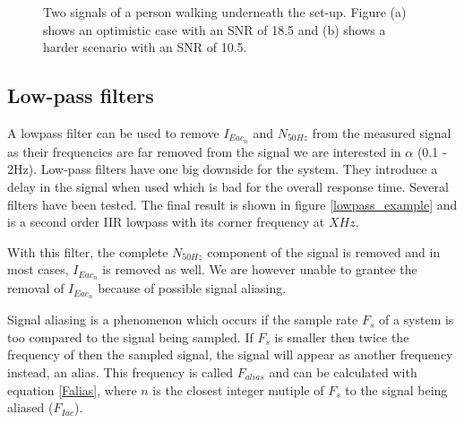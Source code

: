 \begin{figure}
	\centering     %
	\label{Original_signal}
	\caption{Two signals of a person walking underneath the set-up. Figure (a) shows an optimistic case with an SNR of 18.5 and (b) shows a harder scenario with an SNR of 10.5.}
\end{figure}

\subsection{Low-pass filters}
A lowpass filter can be used to remove $I_{Eac{_n}}$ and $N_{50Hz}$ from the measured signal as their frequencies are far removed from the signal we are interested in $\alpha$ (0.1 - 2Hz). Low-pass filters have one big downside for the system. They introduce a delay in the signal when used which is bad for the overall response time. Several filters have been tested. The final result is shown in figure \ref{lowpass_example} and is a second order IIR lowpass with its corner frequency at $XHz$. 

With this filter, the complete $N_{50Hz}$ component of the signal is removed and in most cases, $I_{Eac{_n}}$ is removed as well. We are however unable to grantee the removal of $I_{Eac{_n}}$ because of possible signal aliasing.

Signal aliasing is a phenomenon which occurs if the sample rate $F_{s}$ of a system is too compared to the signal being sampled. If $F_{s}$ is smaller then twice the frequency of then the sampled signal, the signal will appear as another frequency instead, an alias. This frequency is called $F_{alias}$ and can be calculated with equation \ref{Falias}, where $n$ is the closest integer mutiple of $F_{s}$ to the signal being aliased ($F_{Iac}$).


